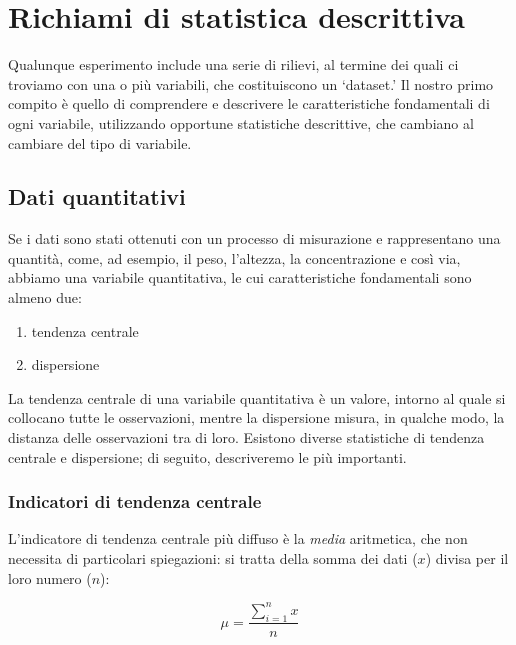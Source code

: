 \documentclass[a4paper,12pt,oneside]{book}
\providecommand{\tightlist}{%
  \setlength{\itemsep}{0pt}\setlength{\parskip}{0pt}}
\begin{document}
\hypertarget{richiami-di-statistica-descrittiva}{%
\chapter{Richiami di statistica descrittiva}\label{richiami-di-statistica-descrittiva}}

Qualunque esperimento include una serie di rilievi, al termine dei quali ci troviamo con una o più variabili, che costituiscono un `dataset.' Il nostro primo compito è quello di comprendere e descrivere le caratteristiche fondamentali di ogni variabile, utilizzando opportune statistiche descrittive, che cambiano al cambiare del tipo di variabile.

\hypertarget{dati-quantitativi}{%
\section{Dati quantitativi}\label{dati-quantitativi}}

Se i dati sono stati ottenuti con un processo di misurazione e rappresentano una quantità, come, ad esempio, il peso, l'altezza, la concentrazione e così via, abbiamo una variabile quantitativa, le cui caratteristiche fondamentali sono almeno due:

\begin{enumerate}
\def\labelenumi{\arabic{enumi}.}
\tightlist
\item
  tendenza centrale
\item
  dispersione
\end{enumerate}

La tendenza centrale di una variabile quantitativa è un valore, intorno al quale si collocano tutte le osservazioni, mentre la dispersione misura, in qualche modo, la distanza delle osservazioni tra di loro. Esistono diverse statistiche di tendenza centrale e dispersione; di seguito, descriveremo le più importanti.

\hypertarget{indicatori-di-tendenza-centrale}{%
\subsection{Indicatori di tendenza centrale}\label{indicatori-di-tendenza-centrale}}

L'indicatore di tendenza centrale più diffuso è la \emph{media} aritmetica, che non necessita di particolari spiegazioni: si tratta della somma dei dati (\(x\)) divisa per il loro numero (\(n\)):

\[\mu = \frac{\sum\limits_{i = 1}^n x}{n}\]
\end{document}
